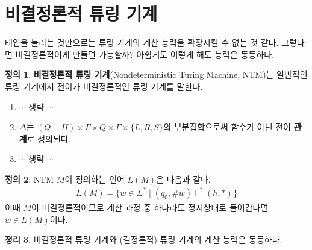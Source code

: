 \documentclass[b5paper, 10pt]{book}
\theoremstyle{definition}
\newtheorem{defn}{정의}[chapter]
\newtheorem{thm}[defn]{정리}
\begin{document}
\section{비결정론적 튜링 기계}
테입을 늘리는 것만으로는 튜링 기계의 계산 능력을 확장시킬 수 없는 것 같다. 그렇다면 비결정론적이게
만들면 가능할까? 아쉽게도 이렇게 해도 능력은 동등하다.
\begin{defn}
\textbf{비결정론적 튜링 기계}(Nondeterministic Turing Machine, NTM)는 일반적인 튜링 기계에서 
전이가 비결정론적인 튜링 기계를 말한다. 
\begin{enumerate}
    \item $\cdots$ 생략 $\cdots$
    \item $\Delta$는 $(Q-H) \times \Gamma \times Q \times \Gamma \times \{L, R, S\}$의 부분집합으로써 
    함수가 아닌 전이 \textbf{관계}로 정의된다.
    \item $\cdots$ 생략 $\cdots$
\end{enumerate}
\end{defn}
\begin{defn}
    NTM $M$이 정의하는 언어 $L(M)$은 다음과 같다.
    \begin{align*}
        L(M) = \{w \in \Sigma^* \;\vert\; (q_0, \underbar{\#}w) \vdash^* (h, *)\}
    \end{align*}
    이때 $M$이 비결정론적이므로 계산 과정 중 하나라도 정지상태로 들어간다면 $w \in L(M)$이다. 
\end{defn}
\begin{thm} \label{NTM pf}
    비결정론적 튜링 기계와 (결정론적) 튜링 기계의 계산 능력은 동등하다. 
\end{thm}
\end{document}
